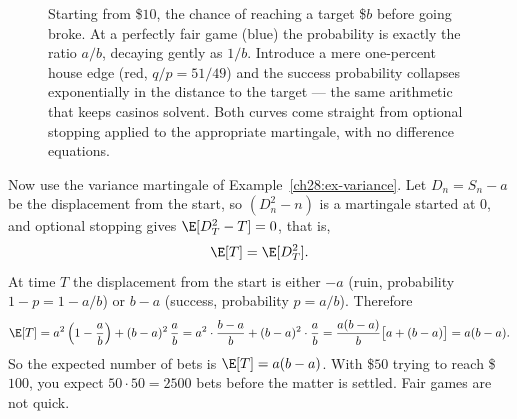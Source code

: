 \begin{figure}[H]
\centering
{}
\caption{Starting from \$$10$, the chance of reaching a target \$$b$ before going broke. At a perfectly
fair game (blue) the probability is exactly the ratio $a/b$, decaying gently as $1/b$. Introduce a mere
one-percent house edge (red, $q/p = 51/49$) and the success probability collapses exponentially in the
distance to the target --- the same arithmetic that keeps casinos solvent. Both curves come straight
from optional stopping applied to the appropriate martingale, with no difference equations.}
\label{ch28:fig-ruin}
\end{figure}

\begin{example}
\label{ch28:ex-duration}
Now use the variance martingale of Example~\ref{ch28:ex-variance}. Let $D_n = S_n - a$ be the
displacement from the start, so $(D_n^2 - n)$ is a martingale started at $0$, and optional stopping
gives $\E[D_T^2 - T] = 0$, that is,
\[
  \E[T] = \E[D_T^2].
\]
At time $T$ the displacement from the start is either $-a$ (ruin, probability $1-p = 1 - a/b$) or
$b - a$ (success, probability $p = a/b$). Therefore
\[
  \E[T] = a^2\left(1 - \frac{a}{b}\right) + (b-a)^2\,\frac{a}{b}
        = a^2 \cdot \frac{b-a}{b} + (b-a)^2 \cdot \frac{a}{b}
        = \frac{a(b-a)}{b}\big[a + (b-a)\big] = a(b-a).
\]
So the expected number of bets is $\E[T] = a(b-a)$. With \$$50$ trying to reach \$$100$, you expect
$50\cdot 50 = 2500$ bets before the matter is settled. Fair games are not quick.
\end{example}

